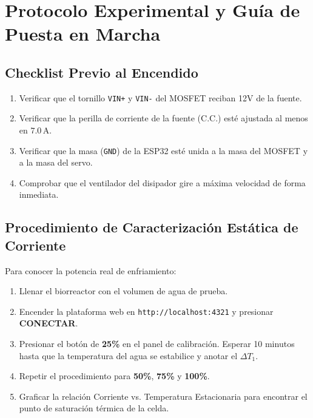 \documentclass[11pt,letterpaper]{article}
\begin{document}
\section{Protocolo Experimental y Guía de Puesta en Marcha}

\subsection{Checklist Previo al Encendido}
\begin{enumerate}
    \item Verificar que el tornillo \texttt{VIN+} y \texttt{VIN-} del MOSFET reciban 12V de la fuente.
    \item Verificar que la perilla de corriente de la fuente (C.C.) esté ajustada al menos en $7.0\,\text{A}$.
    \item Verificar que la masa (\texttt{GND}) de la ESP32 esté unida a la masa del MOSFET y a la masa del servo.
    \item Comprobar que el ventilador del disipador gire a máxima velocidad de forma inmediata.
\end{enumerate}

\subsection{Procedimiento de Caracterización Estática de Corriente}
Para conocer la potencia real de enfriamiento:
\begin{enumerate}
    \item Llenar el biorreactor con el volumen de agua de prueba.
    \item Encender la plataforma web en \texttt{http://localhost:4321} y presionar \textbf{CONECTAR}.
    \item Presionar el botón de \textbf{25\%} en el panel de calibración. Esperar 10 minutos hasta que la temperatura del agua se estabilice y anotar el $\Delta T_1$.
    \item Repetir el procedimiento para \textbf{50\%}, \textbf{75\%} y \textbf{100\%}.
    \item Graficar la relación Corriente vs. Temperatura Estacionaria para encontrar el punto de saturación térmica de la celda.
\end{enumerate}
\end{document}
